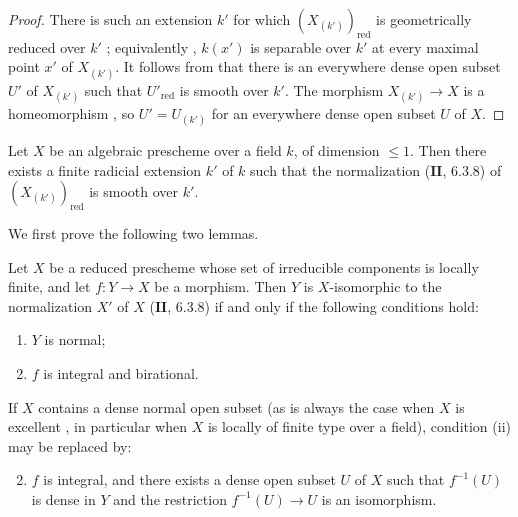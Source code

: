 \begin{proof}
There is such an extension $k'$ for which $(X_{(k')})_{\mathrm{red}}$ is geometrically reduced over $k'$ ; equivalently , $k(x')$ is separable over $k'$ at every maximal point $x'$ of $X_{(k')}$.  It follows from  that there is an everywhere dense open subset $U'$ of $X_{(k')}$ such that $U'_{\mathrm{red}}$ is smooth over $k'$.  The morphism
$X_{(k')}\to X$ is a homeomorphism , so $U'=U_{(k')}$ for an everywhere dense open subset $U$ of $X$.
\end{proof}

\begin{proposition}[17.15.14]
\label{IV.17.15.14}
Let $X$ be an algebraic prescheme over a field $k$, of dimension $\leq 1$.
Then there exists a finite radicial extension $k'$ of $k$ such that the normalization ($\mathbf{II}$, 6.3.8) of $(X_{(k')})_{\mathrm{red}}$ is smooth over $k'$.
\end{proposition}

We first prove the following two lemmas.

\begin{lemma}[17.15.14.1]
\label{IV.17.15.14.1}
Let $X$ be a reduced prescheme whose set of irreducible components is locally finite, and let $f:Y\to X$ be a morphism.  Then $Y$ is $X$-isomorphic to the normalization $X'$ of $X$ ($\mathbf{II}$, 6.3.8) if and only if the following conditions hold:
\begin{enumerate}[label=(\roman*)]
 \item $Y$ is normal;
 \item $f$ is integral and birational.
\end{enumerate}
If $X$ contains a dense normal open subset (as is always the case when $X$ is excellent , in particular when $X$ is locally of finite type over a field), condition (ii) may be replaced by:
\begin{enumerate}[label=(\roman* bis)]
 \setcounter{enumi}{1}
 \item $f$ is integral, and there exists a dense open subset $U$ of $X$ such that $f^{-1}(U)$ is dense in $Y$ and the restriction $f^{-1}(U)\to U$ is an isomorphism.
\end{enumerate}
\end{lemma}

